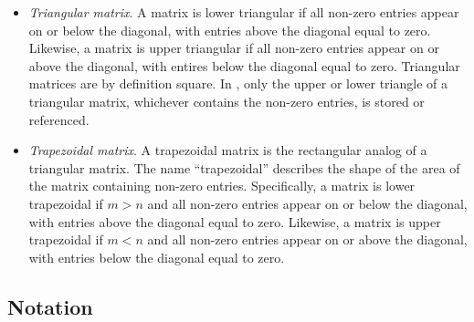 \begin{itemize}
\item
{\em Triangular matrix}.
A matrix is lower triangular if all non-zero entries appear on or below the
diagonal, with entries above the diagonal equal to zero.
Likewise, a matrix is upper triangular if all non-zero entries appear on or
above the diagonal, with entires below the diagonal equal to zero.
Triangular matrices are by definition square.
In \libflamens, only the upper or lower triangle of a triangular matrix,
whichever contains the non-zero entries, is stored or
referenced.\footnotemark[\value{footnote}]

\item
{\em Trapezoidal matrix}.
A trapezoidal matrix is the rectangular analog of a triangular matrix.
The name ``trapezoidal'' describes the shape of the area of the matrix
containing non-zero entries.
Specifically, a matrix is lower trapezoidal if $ m > n $ and all non-zero
entries appear on or below the diagonal, with entries above the diagonal equal
to zero.
Likewise, a matrix is upper trapezoidal if $ m < n $ and all non-zero
entries appear on or above the diagonal, with entries below the diagonal equal
to zero.

\end{itemize}







\subsection{Notation}


